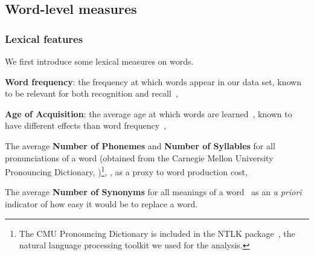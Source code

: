 \subsection{Word-level measures}

\subsubsection{Lexical features}

We first introduce some lexical measures on words.

\begin{APAitemize}

    \item \textbf{Word frequency}: the frequency at which words appear in our data set, known to be relevant for both recognition and recall~\citep{gregg_word_1976},

    \item \textbf{Age of Acquisition}: the average age at which words are learned~\citep[obtained from][]{kuperman_age--acquisition_2012}, known to have different effects than word frequency~\citep{morrison_roles_1995,dewhurst_separate_1998},

    \item {}

    \item The average \textbf{Number of Phonemes} and \textbf{Number of Syllables} for all pronunciations of a word (obtained from the Carnegie Mellon University Pronouncing Dictionary, \citealp{weide_cmu_1998})\footnote{
    The CMU Pronouncing Dictionary is included in the NTLK package~\citep{bird_nltk_2009}, the natural language processing toolkit we used for the analysis.
    },
    , as a proxy to word production cost,

    \item The average \textbf{Number of Synonyms} for all meanings of a word~\citep[obtained from][]{wordnet_princeton_2010} as an \emph{a priori} indicator of how easy it would be to replace a word.

\end{APAitemize}


